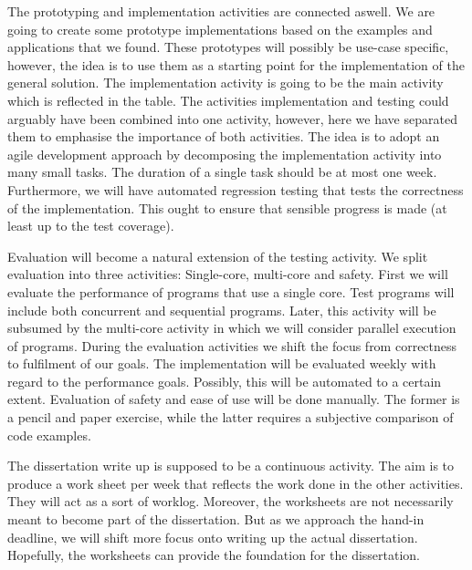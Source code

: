 \documentclass[preprint,10pt,numbers]{sigplanconf}
\begin{document}
The prototyping and implementation activities are connected aswell. We are going to create some prototype implementations based on the examples and applications that we found. These prototypes will possibly be use-case specific, however, the idea is to use them as a starting point for the implementation of the general solution.
The implementation activity is going to be the main activity which is reflected in the table. The activities implementation and testing could arguably have been combined into one activity, however, here we have separated them to emphasise the importance of both activities. The idea is to adopt an agile development approach by decomposing the implementation activity into many small tasks. The duration of a single task should be at most one week. Furthermore, we will have automated regression testing that tests the correctness of the implementation. This ought to ensure that sensible progress is made (at least up to the test coverage).

Evaluation will become a natural extension of the testing activity. We split evaluation into three activities: Single-core, multi-core and safety. First we will evaluate the performance of programs that use a single core. Test programs will include both concurrent and sequential programs. Later, this activity will be subsumed by the multi-core activity in which we will consider parallel execution of programs.
During the evaluation activities we shift the focus from correctness to fulfilment of our goals. The implementation will be evaluated weekly with regard to the performance goals. Possibly, this will be automated to a certain extent. Evaluation of safety and ease of use will be done manually. The former is a pencil and paper exercise, while the latter requires a subjective comparison of code examples.

The dissertation write up is supposed to be a continuous activity. The aim is to produce a work sheet per week that reflects the work done in the other activities. They will act as a sort of worklog. Moreover, the worksheets are not necessarily meant to become part of the dissertation. But as we approach the hand-in deadline, we will shift more focus onto writing up the actual dissertation. Hopefully, the worksheets can provide the foundation for the dissertation.


\softraggedright

\end{document}
